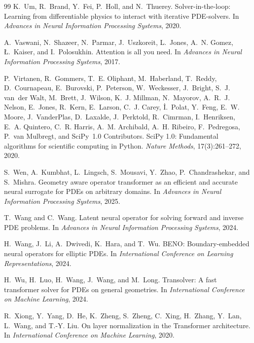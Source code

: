 \documentclass{article}
\begin{document}
\begin{thebibliography}{99}
K.~Um, R.~Brand, Y.~Fei, P.~Holl, and N.~Thuerey.
\newblock Solver-in-the-loop: Learning from differentiable physics to
interact with iterative PDE-solvers.
\newblock In \emph{Advances in Neural Information Processing Systems},
2020.

A.~Vaswani, N.~Shazeer, N.~Parmar, J.~Uszkoreit, L.~Jones, A.~N. Gomez,
\L.~Kaiser, and I.~Polosukhin.
\newblock Attention is all you need.
\newblock In \emph{Advances in Neural Information Processing Systems},
2017.

P.~Virtanen, R.~Gommers, T.~E. Oliphant, M.~Haberland, T.~Reddy,
D.~Cournapeau, E.~Burovski, P.~Peterson, W.~Weckesser, J.~Bright, S.~J.
van~der Walt, M.~Brett, J.~Wilson, K.~J. Millman, N.~Mayorov, A.~R.~J.
Nelson, E.~Jones, R.~Kern, E.~Larson, C.~J. Carey, \.I.~Polat, Y.~Feng,
E.~W. Moore, J.~VanderPlas, D.~Laxalde, J.~Perktold, R.~Cimrman,
I.~Henriksen, E.~A. Quintero, C.~R. Harris, A.~M. Archibald, A.~H.
Ribeiro, F.~Pedregosa, P.~van Mulbregt, and SciPy~1.0 Contributors.
\newblock SciPy 1.0: Fundamental algorithms for scientific computing
in Python.
\newblock \emph{Nature Methods}, 17(3):261--272, 2020.

S.~Wen, A.~Kumbhat, L.~Lingsch, S.~Mousavi, Y.~Zhao, P.~Chandrashekar,
and S.~Mishra.
\newblock Geometry aware operator transformer as an efficient and
accurate neural surrogate for PDEs on arbitrary domains.
\newblock In \emph{Advances in Neural Information Processing Systems},
2025.

T.~Wang and C.~Wang.
\newblock Latent neural operator for solving forward and inverse PDE
problems.
\newblock In \emph{Advances in Neural Information Processing Systems},
2024.

H.~Wang, J.~Li, A.~Dwivedi, K.~Hara, and T.~Wu.
\newblock BENO: Boundary-embedded neural operators for elliptic PDEs.
\newblock In \emph{International Conference on Learning Representations},
2024.

H.~Wu, H.~Luo, H.~Wang, J.~Wang, and M.~Long.
\newblock Transolver: A fast transformer solver for PDEs on general
geometries.
\newblock In \emph{International Conference on Machine Learning}, 2024.

R.~Xiong, Y.~Yang, D.~He, K.~Zheng, S.~Zheng, C.~Xing, H.~Zhang,
Y.~Lan, L.~Wang, and T.-Y. Liu.
\newblock On layer normalization in the Transformer architecture.
\newblock In \emph{International Conference on Machine Learning}, 2020.


\end{thebibliography}
\end{document}
